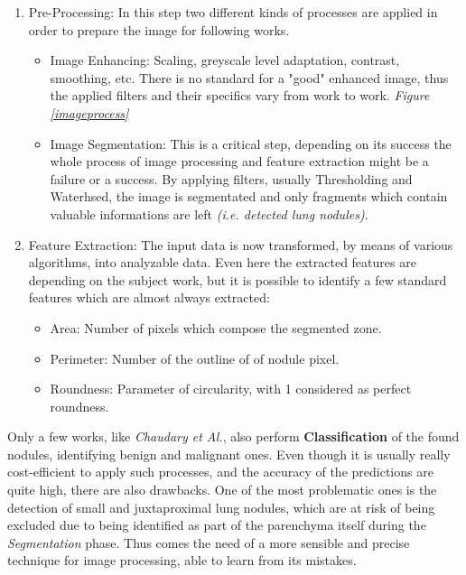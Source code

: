 \documentclass[../main.tex]{subfiles}
\begin{document}
\begin{enumerate}
	\item Pre-Processing: In this step two different kinds of processes are applied in order to prepare the image for following works.
	\begin{itemize}
		\item Image Enhancing: Scaling, greyscale level adaptation, contrast, smoothing, etc. There is no standard for a "good" enhanced image, thus the applied filters and their specifics vary from work to work. \textit{Figure \ref{imageprocess}}
		\item Image Segmentation: This is a critical step, depending on its success the whole process of image processing and feature extraction might be a failure or a success. By applying filters, usually Thresholding and Waterhsed, the image is segmentated and only fragments which contain valuable informations are left \textit{(i.e. detected lung nodules)}.
	\end{itemize}
	\item Feature Extraction: The input data is now transformed, by means of various algorithms, into analyzable data. Even here the extracted features are depending on the subject work, but it is possible to identify a few standard features which are almost always extracted:
	\begin{itemize}
		\item Area: Number of pixels which compose the segmented zone.
		\item Perimeter: Number of the outline of of nodule pixel.
		\item Roundness: Parameter of circularity, with 1 considered as perfect roundness.
	\end{itemize}
\end{enumerate}

Only a few works, like \textit{Chaudary et Al.}\cite{Chaudhary2012}, also perform \textbf{Classification} of the found nodules, identifying benign and malignant ones.
Even though it is usually really cost-efficient to apply such processes, and the accuracy of the predictions are quite high, there are also drawbacks. One of the most problematic ones is the detection of small and juxtaproximal lung nodules, which are at risk of being excluded due to being identified as part of the parenchyma itself during the \textit{Segmentation} phase. Thus comes the need of a more sensible and precise technique for image processing, able to learn from its mistakes. 
\end{document}
